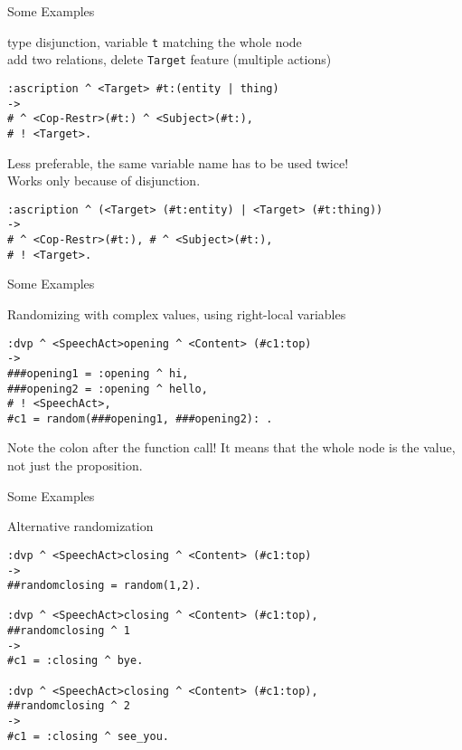 \documentclass{beamer}
\begin{document}

\begin{frame}[fragile]{Some Examples}
\begin{block}{type disjunction, variable \texttt{t} matching the whole node\\
 add two relations, delete \texttt{Target} feature (multiple actions)}
\vspace*{-2.5ex}%
\begin{verbatim}
:ascription ^ <Target> #t:(entity | thing)
->
# ^ <Cop-Restr>(#t:) ^ <Subject>(#t:),
# ! <Target>.
\end{verbatim}
\end{block}

\begin{block}{Less preferable, the same variable name has to be used twice!\\
    Works only because of disjunction.}
\vspace*{-2.5ex}%
\begin{verbatim}
:ascription ^ (<Target> (#t:entity) | <Target> (#t:thing))
->
# ^ <Cop-Restr>(#t:), # ^ <Subject>(#t:),
# ! <Target>.
\end{verbatim}
\end{block}

\end{frame}


\begin{frame}[fragile]{Some Examples}
  \begin{block}{Randomizing with complex values, using right-local variables}
\vspace*{-2.5ex}%
\begin{verbatim}
:dvp ^ <SpeechAct>opening ^ <Content> (#c1:top)
->
###opening1 = :opening ^ hi,
###opening2 = :opening ^ hello,
# ! <SpeechAct>,
#c1 = random(###opening1, ###opening2): .
\end{verbatim}
Note the colon after the function call! It means that the whole node is the
value, not just the proposition.
  \end{block}
\end{frame}


\begin{frame}[fragile]{Some Examples}
\begin{block}{Alternative randomization}
\vspace*{-2.5ex}%
\begin{verbatim}
:dvp ^ <SpeechAct>closing ^ <Content> (#c1:top)
->
##randomclosing = random(1,2).

:dvp ^ <SpeechAct>closing ^ <Content> (#c1:top),
##randomclosing ^ 1
->
#c1 = :closing ^ bye.

:dvp ^ <SpeechAct>closing ^ <Content> (#c1:top),
##randomclosing ^ 2
->
#c1 = :closing ^ see_you.
\end{verbatim}
\end{block}

\end{frame}
\end{document}
